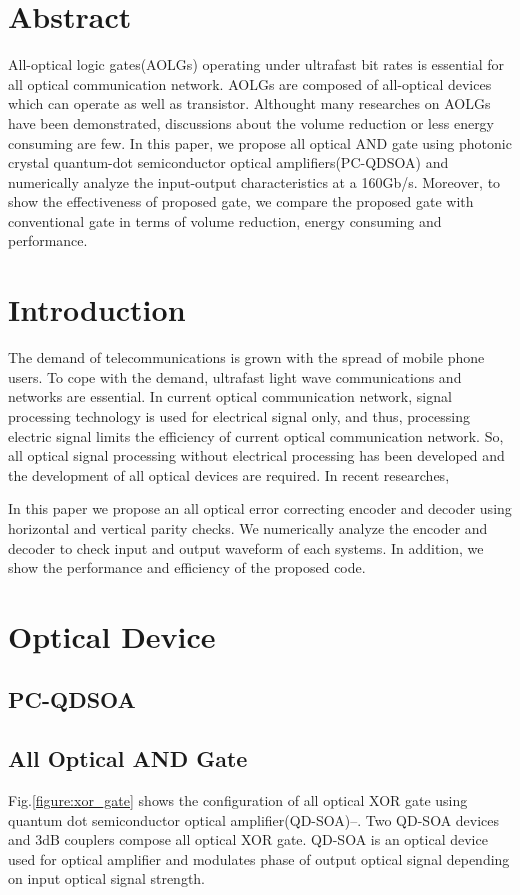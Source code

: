 \documentclass[twocolumn,a4paper]{article}
\begin{document}
\section*{Abstract}

All-optical logic gates(AOLGs) operating under ultrafast bit rates is essential for all optical communication network. AOLGs are composed of all-optical devices which can operate as well as transistor. Althought many researches on AOLGs have been demonstrated, discussions about the volume reduction or less energy consuming are few. In this paper, we propose all optical AND gate using photonic crystal quantum-dot semiconductor optical amplifiers(PC-QDSOA) and numerically analyze the input-output characteristics at a 160Gb/s. Moreover, to show the effectiveness of proposed gate, we compare the proposed gate with conventional gate in terms of volume reduction, energy consuming and performance.

\section{Introduction}
The demand of telecommunications is grown with the spread of mobile phone users. To cope with the demand, ultrafast light wave communications and networks are essential. In current optical communication network, signal processing technology is used for electrical signal only, and thus, processing electric signal limits the efficiency of current optical communication network{\cite{App}}. So, all optical signal processing  without electrical processing has been developed and the development of all optical devices are required. In recent researches, 

In this paper we propose an all optical error correcting encoder and decoder using horizontal and vertical parity checks. We numerically analyze the encoder and decoder to check input and output waveform of each systems. In addition, we show the performance and efficiency of the proposed code.

\section{Optical Device}
\subsection{PC-QDSOA}


\subsection{All Optical AND Gate}
Fig.{\ref{figure:xor_gate}} shows the configuration of all optical XOR gate using quantum dot semiconductor optical amplifier(QD-SOA){\cite{Omar}}--{\cite{Ultrafast}}. Two QD-SOA devices and 3dB couplers compose all optical XOR gate. QD-SOA is an optical device used for optical amplifier and modulates phase of output optical signal depending on input optical signal strength.
\end{document}
